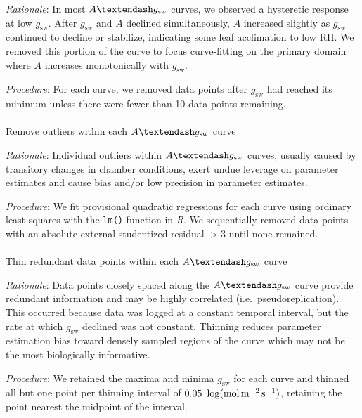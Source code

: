 \documentclass[
  letterpaper,
  DIV=11,
  numbers=noendperiod]{scrartcl}
\makeatletter
\let\oldparagraph\paragraph
\renewcommand{\paragraph}{
    \@ifstar
      \xxxParagraphStar
      \xxxParagraphNoStar
  }
\newcommand{\xxxParagraphStar}[1]{\oldparagraph*{#1}\mbox{}}
\newcommand{\xxxParagraphNoStar}[1]{\oldparagraph{#1}\mbox{}}
\newcommand{\agcurve}{$A \textendash g_\text{sw}$}
\newcommand{\gsw}{$g_\text{sw}$}
\newcommand{\rh}{$\mathrm{RH}$}
\makeatother
\begin{document}
\emph{Rationale}: In most \agcurve{} curves, we observed a hysteretic
response at low \gsw. After \gsw{} and \(A\) declined simultaneously,
\(A\) increased slightly as \gsw{} continued to decline or stabilize,
indicating some leaf acclimation to low \rh. We removed this portion of
the curve to focus curve-fitting on the primary domain where \(A\)
increases monotonically with \gsw{}.

\emph{Procedure}: For each curve, we removed data points after \gsw{}
had reached its minimum unless there were fewer than 10 data points
remaining.

\paragraph{\texorpdfstring{Remove outliers within each \agcurve{}
curve}{Remove outliers within each  curve}}\label{remove-outliers-within-each-curve}

\emph{Rationale}: Individual outliers within \agcurve{} curves, usually
caused by transitory changes in chamber conditions, exert undue leverage
on parameter estimates and cause bias and/or low precision in parameter
estimates.

\emph{Procedure}: We fit provisional quadratic regressions for each
curve using ordinary least squares with the \texttt{lm()} function in
\emph{R}. We sequentially removed data points with an absolute external
studentized residual \(> 3\) until none remained.

\paragraph{\texorpdfstring{Thin redundant data points within each
\agcurve{}
curve}{Thin redundant data points within each  curve}}\label{thin-redundant-data-points-within-each-curve}

\emph{Rationale}: Data points closely spaced along the \agcurve{} curve
provide redundant information and may be highly correlated
(i.e.~pseudoreplication). This occurred because data was logged at a
constant temporal interval, but the rate at which \gsw{} declined was
not constant. Thinning reduces parameter estimation bias toward densely
sampled regions of the curve which may not be the most biologically
informative.

\emph{Procedure}: We retained the maxima and minima \gsw{} for each
curve and thinned all but one point per thinning interval of
\(0.05~\log(\si{\mol\raiseto{-2}\meter\raiseto{-1}\second})\), retaining
the point nearest the midpoint of the interval.
\end{document}
